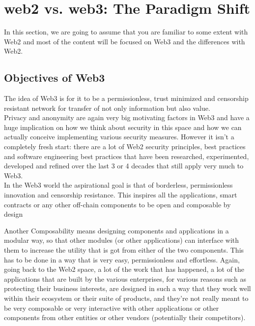 \section{web2 vs. web3: The Paradigm Shift}

In this section, we are going to assume that you are familiar to some extent with Web2 and most of the content will be focused on Web3 and the differences with Web2.

\subsection*{Objectives of Web3}

The idea of Web3 is for it to be a permissionless, trust minimized and censorship resistant network for transfer of not only information but also value.\\

Privacy and anonymity are again very big motivating factors in Web3 and have a huge implication on how we think about security in this space and how we can actually conceive implementing various security measures.
However it isn't a completely fresh start: there are a lot of Web2 security principles, best practices and software engineering best practices that have been researched, experimented, developed and refined over the last 3 or 4 decades that still apply very much to Web3.\\

In the Web3 world the aspirational goal is that of borderless, permissionless innovation and censorship resistance. This inspires all the applications, smart contracts or any other off-chain components to be open and composable by design

Another 
Composability means designing components and applications in a modular way, so that other modules (or other applications) can interface with them to increase the utility that is got from either of the two components. This has to be done in a way that is very easy, permissionless and effortless. Again, going back to the Web2 space, a lot of the work that has happened, a lot of the applications that are built by the various enterprises, for various reasons such as protecting their business interests, are designed in such a way that they work well within their ecosystem or their suite of products, and they're not really meant to be very composable or very interactive with other applications or other components from other entities or other vendors (potentially their competitors).\\

